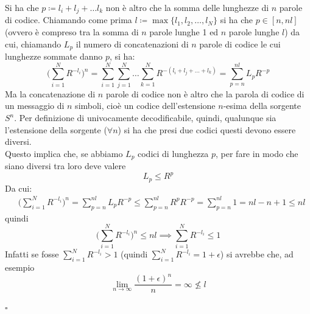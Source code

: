 \begin{tcolorbox}
Si ha che $p \coloneqq l_i + l_j + \dots l_k$ non \`e altro che la somma delle lunghezze di $n$ parole di codice. Chiamando come prima $l \coloneqq \max \{l_1, l_2, \dots, l_N\}$ si ha che $p \in [n, nl]$ (ovvero \`e compreso tra la somma di $n$ parole lunghe 1 ed $n$ parole lunghe $l$) da cui, chiamando $L_p$ il numero di concatenazioni di $n$ parole di codice le cui lunghezze sommate danno $p$, si ha:
\begin{equation*}
    \Big ( \sum_{i=1}^N R^{-l_i} \Big )^n = \sum_{i=1}^N \sum_{j=1}^N \dots \sum_{k=1}^N R^{-(l_i + l_j + \dots + l_k)} = \sum_{p=n}^{nl} L_p R^{-p}
\end{equation*}
Ma  la concatenazione  di $n$ parole di codice  non  è  altro  che la parola di codice  di  un  messaggio  di $n$ simboli, cio\`e  un  codice dell’estensione $n$-esima della sorgente $S^n$. Per definizione di univocamente decodificabile, quindi, qualunque sia l’estensione della sorgente ($\forall n$) si ha che presi due codici questi devono essere diversi. \\
Questo implica che, se abbiamo $L_p$ codici di lunghezza $p$, per fare in modo che siano diversi tra loro deve valere
\begin{equation*}
    L_p \leq R^p
\end{equation*}
Da cui:
\begin{align*}
    &\Big ( \sum_{i=1}^N R^{-l_i} \Big )^n = \sum_{p=n}^{nl} L_p R^{-p} \leq \sum_{p=n}^{nl} R^p R^{-p} = \sum_{p=n}^{nl} 1 = nl - n + 1  \leq nl
\end{align*}
quindi
\begin{equation*}
    \Big ( \sum_{i=1}^N R^{-l_i} \Big )^n \leq nl \implies \sum_{i=1}^N R^{-l_i} \leq 1
\end{equation*}
Infatti se fosse $ \sum_{i=1}^N R^{-l_i} > 1$ (quindi $\sum_{i=1}^N R^{-l_i} = 1 + \epsilon$) si avrebbe che, ad esempio
\begin{equation*}
\lim_{n \to \infty} \frac{(1+\epsilon)^n}{n} = \infty \nleq l
\end{equation*}

$\square$
\end{tcolorbox}

